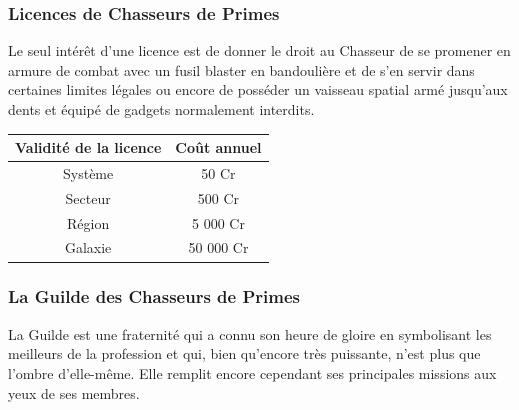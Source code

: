 \documentclass[twoside]{article}
\begin{document}
\subsubsection{Licences de Chasseurs de Primes}
Le seul intérêt d'une licence est de donner le droit au Chasseur de se promener en armure de combat avec un fusil blaster en bandoulière et de s'en servir dans certaines limites légales ou encore de posséder un vaisseau spatial armé jusqu'aux dents et équipé de gadgets normalement interdits.\\

\begin{center}
	\begin{tabular}{|c|c|}
		\hline 
		\rule[-1ex]{0pt}{2.5ex} Validité de la licence & Co\^{u}t annuel \\ 
		\hline 
		\rule[-1ex]{0pt}{2.5ex} Système & 50 Cr \\ 
		\hline 
		\rule[-1ex]{0pt}{2.5ex} Secteur & 500 Cr \\ 
		\hline 
		\rule[-1ex]{0pt}{2.5ex} Région & 5 000 Cr \\ 
		\hline 
		\rule[-1ex]{0pt}{2.5ex} Galaxie & 50 000 Cr \\ 
		\hline 
	\end{tabular}
\end{center}

\subsubsection{La Guilde des Chasseurs de Primes}
La Guilde est une fraternité qui a connu son heure de gloire en symbolisant les meilleurs de la profession et qui, bien qu'encore très puissante, n'est plus que l'ombre d'elle-même. Elle remplit encore cependant ses principales missions aux yeux de ses membres.
\end{document}
